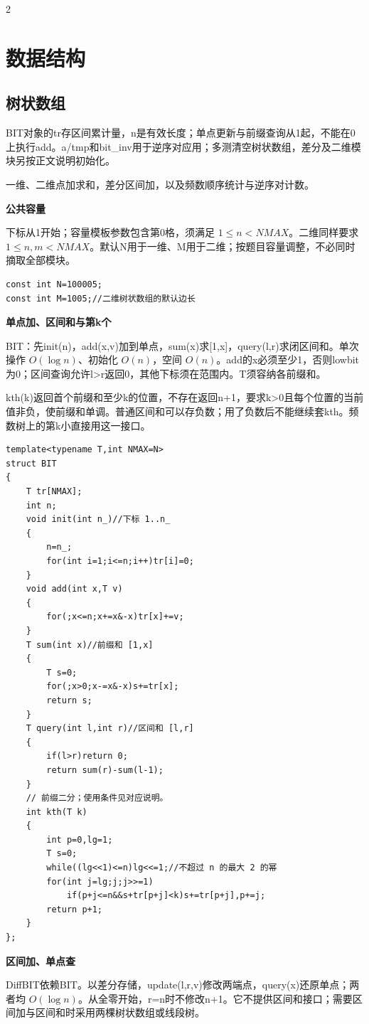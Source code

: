 \documentclass[UTF8,fontset=fandol,a4paper,twoside]{ctexart}
\newcommand{\topic}[1]{\par\smallskip\textbf{#1}\par\nobreak}
\newcommand{\note}[1]{{\fontsize{10}{12}\selectfont #1\par}}
\begin{document}
\begin{multicols}{2}
\section{数据结构}
\subsection{树状数组}

\note{BIT对象的tr存区间累计量，n是有效长度；单点更新与前缀查询从1起，不能在0上执行add。a/\allowbreak{}tmp和bit\_inv用于逆序对应用；多测清空树状数组，差分及二维模块另按正文说明初始化。}
\note{一维、二维点加求和，差分区间加，以及频数顺序统计与逆序对计数。}
\topic{公共容量}
\note{下标从1开始；容量模板参数包含第0格，须满足 $1\le n<NMAX$。二维同样要求 $1\le n,m<NMAX$。默认N用于一维、M用于二维；按题目容量调整，不必同时摘取全部模块。}
\begin{lstlisting}
const int N=100005;
const int M=1005;//二维树状数组的默认边长
\end{lstlisting}
\topic{单点加、区间和与第k个}
\note{BIT：先init(\allowbreak{}n)\allowbreak{}，add(\allowbreak{}x,\allowbreak{}v)\allowbreak{}加到单点，sum(\allowbreak{}x)\allowbreak{}求[\allowbreak{}1,\allowbreak{}x]\allowbreak{}，query(\allowbreak{}l,\allowbreak{}r)\allowbreak{}求闭区间和。单次操作 $O(\log n)$、初始化 $O(n)$，空间 $O(n)$。add的x必须至少1，否则lowbit为0；区间查询允许l>\allowbreak{}r返回0，其他下标须在范围内。T须容纳各前缀和。}
\note{kth(\allowbreak{}k)\allowbreak{}返回首个前缀和至少k的位置，不存在返回n+\allowbreak{}1，要求k>\allowbreak{}0且每个位置的当前值非负，使前缀和单调。普通区间和可以存负数；用了负数后不能继续套kth。频数树上的第k小直接用这一接口。}
\begin{lstlisting}
template<typename T,int NMAX=N>
struct BIT
{
    T tr[NMAX];
    int n;
    void init(int n_)//下标 1..n_
    {
        n=n_;
        for(int i=1;i<=n;i++)tr[i]=0;
    }
    void add(int x,T v)
    {
        for(;x<=n;x+=x&-x)tr[x]+=v;
    }
    T sum(int x)//前缀和 [1,x]
    {
        T s=0;
        for(;x>0;x-=x&-x)s+=tr[x];
        return s;
    }
    T query(int l,int r)//区间和 [l,r]
    {
        if(l>r)return 0;
        return sum(r)-sum(l-1);
    }
    // 前缀二分；使用条件见对应说明。
    int kth(T k)
    {
        int p=0,lg=1;
        T s=0;
        while((lg<<1)<=n)lg<<=1;//不超过 n 的最大 2 的幂
        for(int j=lg;j;j>>=1)
            if(p+j<=n&&s+tr[p+j]<k)s+=tr[p+j],p+=j;
        return p+1;
    }
};
\end{lstlisting}
\topic{区间加、单点查}
\note{DiffBIT依赖BIT。以差分存储，update(\allowbreak{}l,\allowbreak{}r,\allowbreak{}v)\allowbreak{}修改两端点，query(\allowbreak{}x)\allowbreak{}还原单点；两者均 $O(\log n)$。从全零开始，r=\allowbreak{}n时不修改n+\allowbreak{}1。它不提供区间和接口；需要区间加与区间和时采用两棵树状数组或线段树。}

\end{multicols}
\end{document}
